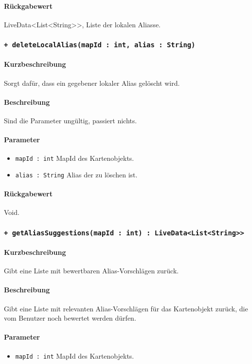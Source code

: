 \paragraph*{Rückgabewert}
LiveData<List<String>>, Liste der lokalen Aliasse.

\subsubsection*{\texttt{+ deleteLocalAlias(mapId : int, alias : String)}}%
\paragraph*{Kurzbeschreibung}
Sorgt dafür, dass ein gegebener lokaler Alias gelöscht wird.
\paragraph*{Beschreibung}
Sind die Parameter ungültig, passiert nichts.
\paragraph*{Parameter}
\begin{itemize}
    \item \texttt{mapId : int} MapId des Kartenobjekts.
    \item \texttt{alias : String} Alias der zu löschen ist.
\end{itemize}
\paragraph*{Rückgabewert}
Void.

\subsubsection*{\texttt{+ getAliasSuggestions(mapId : int) : LiveData<List<String>>}}%
\paragraph*{Kurzbeschreibung}
Gibt eine Liste mit bewertbaren Alias-Vorschlägen zurück.
\paragraph*{Beschreibung}
Gibt eine Liste mit relevanten Alias-Vorschlägen für das Kartenobjekt zurück, 
die vom Benutzer noch bewertet werden dürfen.
\paragraph*{Parameter}
\begin{itemize}
    \item \texttt{mapId : int} MapId des Kartenobjekts.
\end{itemize}
